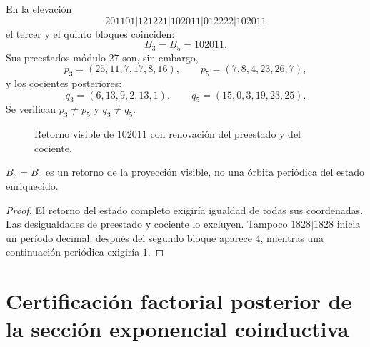 En la elevación
\[
 201101|121221|102011|012222|102011
\]
el tercer y el quinto bloques coinciden:
\[
 B_3=B_5=102011.
\]
Sus preestados módulo \(27\) son, sin embargo,
\[
 p_3=(25,11,7,17,8,16),
 \qquad
 p_5=(7,8,4,23,26,7),
\]
y los cocientes posteriores:
\[
 q_3=(6,13,9,2,13,1),
 \qquad
 q_5=(15,0,3,19,23,25).
\]
Se verifican \(p_3\ne p_5\) y \(q_3\ne q_5\).

\begin{figure}[htbp]
\centering
{}
\caption{Retorno visible de \(102011\) con renovación del preestado y del
cociente.}
\label{gfp:b:fig:ruptura-memoria-e}
\end{figure}

\begin{theorem}
\label{gfp:b:thm:retorno-visible-no-periodico-e}
\(B_3=B_5\) es un retorno de la proyección visible, no una órbita periódica
del estado enriquecido.
\end{theorem}

\begin{proof}
El retorno del estado completo exigiría igualdad de todas sus coordenadas.
Las desigualdades de preestado y cociente lo excluyen. Tampoco
\(1828|1828\) inicia un período decimal: después del segundo bloque aparece
\(4\), mientras una continuación periódica exigiría \(1\).
\end{proof}

\section{Certificación factorial posterior de la sección exponencial coinductiva}

